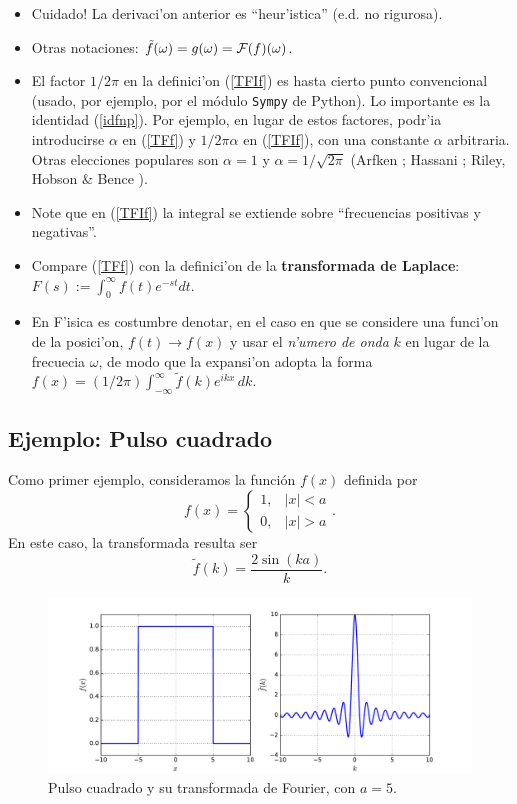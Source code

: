 \begin{itemize}
\item Cuidado! La derivaci'on anterior es ``heur'istica'' (e.d. no rigurosa). 
\item Otras notaciones: $\tilde{f}(\omega)=g(\omega)={\cal F}(f)(\omega)$.
\item El factor $1/2\pi$ en la definici'on (\ref{TFIf}) es hasta cierto punto convencional (usado, por ejemplo, por el módulo \texttt{Sympy} de Python). Lo importante es la identidad (\ref{idfnp}). Por ejemplo, en lugar de estos factores, podr'ia introducirse $\alpha$ en (\ref{TFf}) y $1/2\pi\alpha$ en (\ref{TFIf}), con una constante $\alpha$ arbitraria. Otras elecciones populares son $\alpha=1$ y $\alpha=1/\sqrt{2\pi}$ (Arfken \cite{Arfken}; Hassani \cite{Hassani}; Riley, Hobson \& Bence \cite{Riley}).
\item Note que en (\ref{TFIf}) la integral se extiende sobre ``frecuencias positivas y negativas''.
\item Compare (\ref{TFf}) con la definici'on de la \textbf{transformada de Laplace}: $F(s):=\int_0^\infty f(t)e^{-st}dt$.
\item En F'isica es costumbre denotar, en el caso en que se considere una funci'on de la posici'on, $f(t)\to f(x)$ y usar el \textit{n'umero de onda} $k$ en lugar de la frecuecia $\omega$, de modo que la expansi'on adopta la forma $f(x)=(1/{2\pi})\int_{-\infty}^\infty\tilde{f}(k) e^{ikx} \,dk.$
\end{itemize}

\subsection{Ejemplo: Pulso cuadrado}
Como primer ejemplo, consideramos la función $f(x)$ definida por
\begin{equation}
f(x)=\begin{cases}
1, & |x|<a \\
0, & |x|>a
\end{cases}.
\end{equation}
En este caso, la transformada resulta ser
\begin{equation}
\tilde{f}(k)=\frac{2\sin(ka)}{k}.
\end{equation}
\begin{figure}[h]
\centering
\includegraphics[scale=0.4]{figs/fig-transformada-Fourier-pulso-cuadrado.pdf}
\caption{Pulso cuadrado y su transformada de Fourier, con $a=5$.}
\label{im:pulsocua}
\end{figure}

